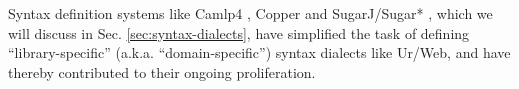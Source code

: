 Syntax definition systems like Camlp4 \cite{ocaml-manual}, Copper \cite{conf/gpce/WykS07} and SugarJ/Sugar* \cite{erdweg2011sugarj,erdweg2013framework}, which we will discuss in Sec. \ref{sec:syntax-dialects}, have simplified the task of defining ``library-specific'' (a.k.a. ``domain-specific'') syntax dialects like Ur/Web, and have thereby contributed to their ongoing proliferation.





